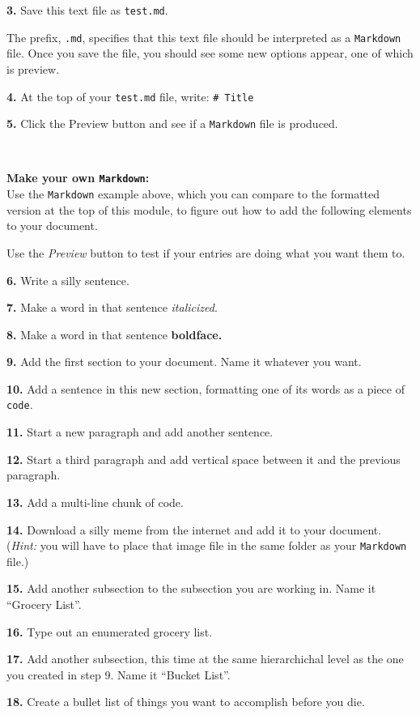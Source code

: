 \documentclass[
]{book}
\begin{document}
\textbf{3.} Save this text file as \texttt{test.md}.

The prefix, \texttt{.md}, specifies that this text file should be interpreted as a \texttt{Markdown} file. Once you save the file, you should see some new options appear, one of which is preview.

\textbf{4.} At the top of your \texttt{test.md} file, write: \texttt{\#\ Title}

\textbf{5.} Click the Preview button and see if a \texttt{Markdown} file is produced.

~

\textbf{Make your own \texttt{Markdown}:}\\
Use the \texttt{Markdown} example above, which you can compare to the formatted version at the top of this module, to figure out how to add the following elements to your document.

Use the \emph{Preview} button to test if your entries are doing what you want them to.

\textbf{6.} Write a silly sentence.

\textbf{7.} Make a word in that sentence \emph{italicized}.

\textbf{8.} Make a word in that sentence \textbf{boldface.}

\textbf{9.} Add the first section to your document. Name it whatever you want.

\textbf{10.} Add a sentence in this new section, formatting one of its words as a piece of \texttt{code}.

\textbf{11.} Start a new paragraph and add another sentence.

\textbf{12.} Start a third paragraph and add vertical space between it and the previous paragraph.

\textbf{13.} Add a multi-line chunk of code.

\textbf{14.} Download a silly meme from the internet and add it to your document. (\emph{Hint:} you will have to place that image file in the same folder as your \texttt{Markdown} file.)

\textbf{15.} Add another subsection to the subsection you are working in. Name it ``Grocery List''.

\textbf{16.} Type out an enumerated grocery list.

\textbf{17.} Add another subsection, this time at the same hierarchichal level as the one you created in step 9. Name it ``Bucket List''.

\textbf{18.} Create a bullet list of things you want to accomplish before you die.
\end{document}
